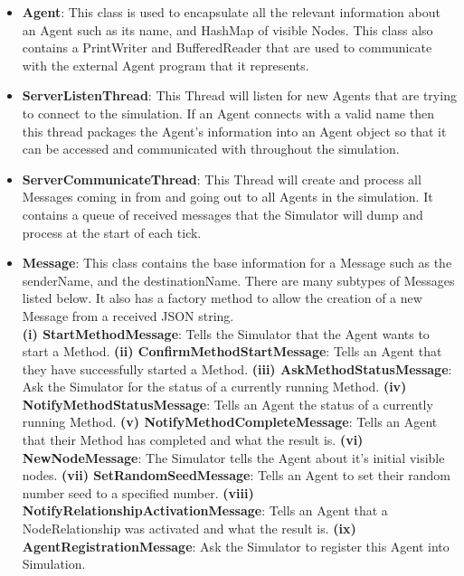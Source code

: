 \begin{enumerate}
\begin{itemize}
\item \textbf{Agent}: This class is used to encapsulate all the relevant information about an Agent such as its name, and HashMap of visible Nodes. This class also contains a PrintWriter and BufferedReader that are used to communicate with the external Agent program that it represents. \\

\item \textbf{ServerListenThread}: This Thread will listen for new Agents that are trying to connect to the simulation. If an Agent connects with a valid name then this thread packages the Agent's information into an Agent object so that it can be accessed and communicated with throughout the simulation. \\

\item \textbf{ServerCommunicateThread}: This Thread will create and process all Messages coming in from and going out to all Agents in the simulation. It contains a queue of received messages that the Simulator will dump and process at the start of each tick.\\

\item \textbf{Message}: This class contains the base information for a Message such as the senderName, and the destinationName. There are many subtypes of Messages listed below. It also has a factory method to allow the creation of a new Message from a received JSON string.\\

\subitem \textbf{(i) StartMethodMessage}: Tells the Simulator that the Agent wants to start a Method.
\subitem \textbf{(ii) ConfirmMethodStartMessage}: Tells an Agent that they have successfully started a Method. 
\subitem \textbf{(iii) AskMethodStatusMessage}: Ask the Simulator for the status of a currently running Method.
\subitem \textbf{(iv) NotifyMethodStatusMessage}: Tells an Agent the status of a currently running Method.
\subitem \textbf{(v) NotifyMethodCompleteMessage}: Tells an Agent that their Method has completed and what the result is.
\subitem \textbf{(vi) NewNodeMessage}: The Simulator tells the Agent about it's initial visible nodes.
\subitem \textbf{(vii) SetRandomSeedMessage}: Tells an Agent to set their random number seed to a specified number.
\subitem \textbf{(viii) NotifyRelationshipActivationMessage}: Tells an Agent that a NodeRelationship was activated and what the result is.
\subitem \textbf{(ix) AgentRegistrationMessage}: Ask the Simulator to register this Agent into Simulation.\\
\end{itemize}


\end{enumerate}
